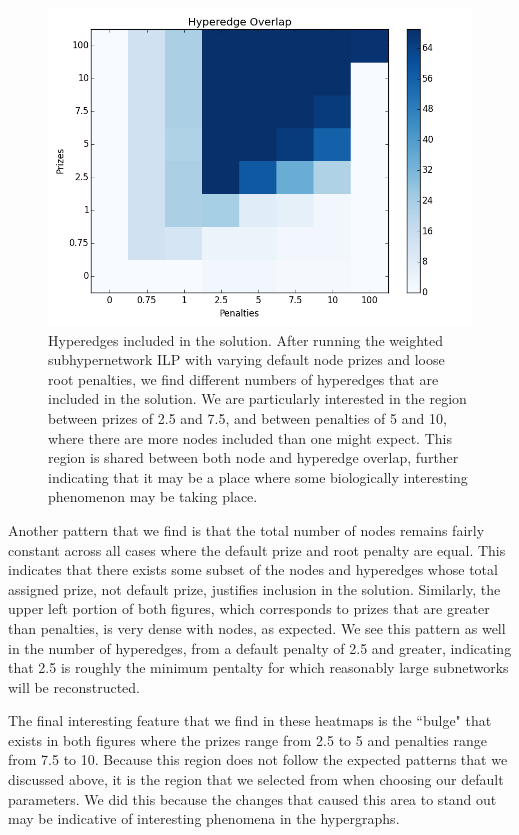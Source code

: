 \documentclass[12pt,twoside]{reedthesis}
\theoremstyle{definition}
\begin{document}
   \begin{figure}
     \centering
     \includegraphics[width=0.8\linewidth]{Hh_hyperedges}
     \caption[Hyperedges included in the solution.]{Hyperedges included in the solution. After running the weighted subhypernetwork ILP with varying default node prizes and loose root penalties, we find different numbers of hyperedges that are included in the solution. We are particularly interested in the region between prizes of 2.5 and 7.5, and between penalties of 5 and 10, where there are more nodes included than one might expect. This region is shared between both node and hyperedge overlap, further indicating that it may be a place where some biologically interesting phenomenon may be taking place.}
     \label{fig:Hh_hyperedges}
   \end{figure}

   Another pattern that we find is that the total number of nodes remains fairly constant across all cases where the default prize and root penalty are equal. This indicates that there exists some subset of the nodes and hyperedges whose total assigned prize, not default prize, justifies inclusion in the solution. Similarly, the upper left portion of both figures, which corresponds to prizes that are greater than penalties, is very dense with nodes, as expected. We see this pattern as well in the number of hyperedges, from a default penalty of 2.5 and greater, indicating that 2.5 is roughly the minimum pentalty for which reasonably large subnetworks will be reconstructed.\par

   The final interesting feature that we find in these heatmaps is the ``bulge" that exists in both figures where the prizes range from 2.5 to 5 and penalties range from 7.5 to 10. Because this region does not follow the expected patterns that we discussed above, it is the region that we selected from when choosing our default parameters. We did this because the changes that caused this area to stand out may be indicative of interesting phenomena in the hypergraphs.\par
\end{document}
